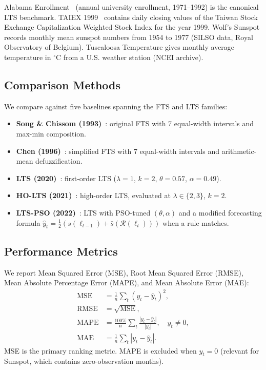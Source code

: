 \documentclass[conference]{IEEEtran}
\begin{document}
Alabama Enrollment~\cite{song1993} (annual university enrollment,
1971--1992) is the canonical LTS benchmark.
TAIEX 1999~\cite{yu2005} contains daily closing values of the Taiwan
Stock Exchange Capitalization Weighted Stock Index for the year 1999.
Wolf's Sunspot records monthly mean sunspot numbers from 1954 to 1977
(SILSO data, Royal Observatory of Belgium).
Tuscaloosa Temperature gives monthly average temperature in
$^{\circ}$C from a U.S. weather station (NCEI archive).

\subsection{Comparison Methods}

We compare against five baselines spanning the FTS and LTS families:
\begin{itemize}
  \item \textbf{Song \& Chissom (1993)}~\cite{song1993}: original
        FTS with 7 equal-width intervals and max-min composition.
  \item \textbf{Chen (1996)}~\cite{chen1996}: simplified FTS with
        7 equal-width intervals and arithmetic-mean defuzzification.
  \item \textbf{LTS (2020)}~\cite{hieu2020lts}: first-order LTS
        ($\lambda=1$, $k=2$, $\theta=0.57$, $\alpha=0.49$).
  \item \textbf{HO-LTS (2021)}~\cite{hieu2021holts}: high-order
        LTS, evaluated at $\lambda \in \{2,3\}$, $k=2$.
  \item \textbf{LTS-PSO (2022)}~\cite{hieu2022ltspso}: LTS with
        PSO-tuned $(\theta,\alpha)$ and a modified forecasting
        formula $\hat{y}_t = \tfrac{1}{2}(s(\ell_{t-1}) +
        \bar{s}(\mathcal{R}(\bm{\ell}_t)))$ when a rule matches.
\end{itemize}

\subsection{Performance Metrics}

We report Mean Squared Error (MSE), Root Mean Squared Error (RMSE),
Mean Absolute Percentage Error (MAPE), and Mean Absolute Error (MAE):
\begin{align}
  \mathrm{MSE}  &= \tfrac{1}{n}\textstyle\sum_{t}(y_t-\hat{y}_t)^2, \\
  \mathrm{RMSE} &= \sqrt{\mathrm{MSE}}, \\
  \mathrm{MAPE} &= \tfrac{100\%}{n}\textstyle\sum_{t}
    \tfrac{|y_t-\hat{y}_t|}{|y_t|},\quad y_t\neq 0, \\
  \mathrm{MAE}  &= \tfrac{1}{n}\textstyle\sum_{t}|y_t-\hat{y}_t|.
\end{align}
MSE is the primary ranking metric. MAPE is excluded when $y_t = 0$
(relevant for Sunspot, which contains zero-observation months).
\end{document}
